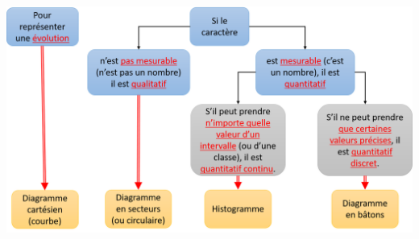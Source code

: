 \documentclass[12pt,a4paper]{article}
\begin{document}
\vspace*{1cm}

\begin{center}
	\includegraphics[scale=0.62]{img/bilan}
\end{center}
\end{document}
